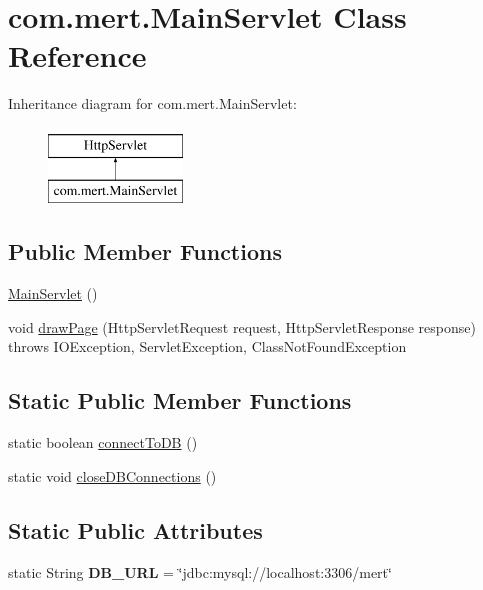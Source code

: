 \hypertarget{classcom_1_1mert_1_1_main_servlet}{}\section{com.\+mert.\+Main\+Servlet Class Reference}
\label{classcom_1_1mert_1_1_main_servlet}
Inheritance diagram for com.\+mert.\+Main\+Servlet\+:\begin{figure}[H]
\begin{center}
\leavevmode
\includegraphics[height=2.000000cm]{classcom_1_1mert_1_1_main_servlet}
\end{center}
\end{figure}
\subsection*{Public Member Functions}
\begin{DoxyCompactItemize}
\item 
\hyperlink{classcom_1_1mert_1_1_main_servlet_a4cd4816907ef657cfb6c7a2403551360}{Main\+Servlet} ()
\item 
void \hyperlink{classcom_1_1mert_1_1_main_servlet_a4add4495834801a2cd1aad092e08d2fb}{draw\+Page} (Http\+Servlet\+Request request, Http\+Servlet\+Response response)  throws I\+O\+Exception, Servlet\+Exception, Class\+Not\+Found\+Exception 
\end{DoxyCompactItemize}
\subsection*{Static Public Member Functions}
\begin{DoxyCompactItemize}
\item 
static boolean \hyperlink{classcom_1_1mert_1_1_main_servlet_a44e2c429b5f5c9e74f58d8ec0c044e63}{connect\+To\+DB} ()
\item 
static void \hyperlink{classcom_1_1mert_1_1_main_servlet_a257918854e3644b8c8d5e4eebb8f5267}{close\+D\+B\+Connections} ()
\end{DoxyCompactItemize}
\subsection*{Static Public Attributes}
\begin{DoxyCompactItemize}
\item 
static String {\bfseries D\+B\+\_\+\+U\+RL} = \char`\"{}jdbc\+:mysql\+://localhost\+:3306/mert\char`\"{}\hypertarget{classcom_1_1mert_1_1_main_servlet_a9ff2045e334deee0d20e6c335a1a5dce}{}\label{classcom_1_1mert_1_1_main_servlet_a9ff2045e334deee0d20e6c335a1a5dce}

\end{DoxyCompactItemize}

